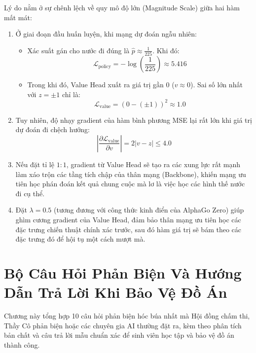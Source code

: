 \documentclass[11pt,a4paper]{report}
\begin{document}
Lý do nằm ở sự chênh lệch về quy mô độ lớn (Magnitude Scale) giữa hai hàm mất mát:
\begin{enumerate}
    \item Ở giai đoạn đầu huấn luyện, khi mạng dự đoán ngẫu nhiên:
    \begin{itemize}
        \item Xác suất gán cho nước đi đúng là $\hat{p} \approx \frac{1}{225}$. Khi đó:
        \begin{equation}
            \mathcal{L}_{\text{policy}} = -\log\left(\frac{1}{225}\right) \approx \mathbf{5.416}
        \end{equation}
        \item Trong khi đó, Value Head xuất ra giá trị gần 0 ($v \approx 0$). Sai số lớn nhất với $z = \pm 1$ chỉ là:
        \begin{equation}
            \mathcal{L}_{\text{value}} = (0 - (\pm 1))^2 \approx \mathbf{1.0}
        \end{equation}
    \end{itemize}
    \item Tuy nhiên, độ nhạy gradient của hàm bình phương MSE lại rất lớn khi giá trị dự đoán đi chệch hướng:
    \begin{equation}
        \left| \frac{\partial \mathcal{L}_{\text{value}}}{\partial v} \right| = 2 |v - z| \le 4.0
    \end{equation}
    \item Nếu đặt tỉ lệ $1:1$, gradient từ Value Head sẽ tạo ra các xung lực rất mạnh làm xáo trộn các tầng tích chập của thân mạng (Backbone), khiến mạng ưu tiên học phán đoán kết quả chung cuộc mà lơ là việc học các hình thế nước đi cụ thể.
    \item Đặt $\lambda = 0.5$ (tương đương với công thức kinh điển của AlphaGo Zero) giúp ghìm cương gradient của Value Head, đảm bảo thân mạng ưu tiên học các đặc trưng chiến thuật chính xác trước, sau đó hàm giá trị sẽ bám theo các đặc trưng đó để hội tụ một cách mượt mà.
\end{enumerate}

\chapter{Bộ Câu Hỏi Phản Biện Và Hướng Dẫn Trả Lời Khi Bảo Vệ Đồ Án}

Chương này tổng hợp 10 câu hỏi phản biện hóc búa nhất mà Hội đồng chấm thi, Thầy Cô phản biện hoặc các chuyên gia AI thường đặt ra, kèm theo phân tích bản chất và câu trả lời mẫu chuẩn xác để sinh viên học tập và bảo vệ đồ án thành công.
\end{document}
